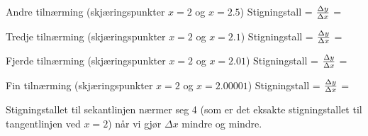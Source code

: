 \vskip 10pt

Andre tilnærming (skjæringspunkter $x = 2$ og $x = 2.5$) \hskip 50pt  Stigningstall = ${\Delta y \over \Delta x}$ = 

\vskip 10pt

Tredje tilnærming (skjæringspunkter $x = 2$ og $x = 2.1$) \hskip 50pt  Stigningstall = ${\Delta y \over \Delta x}$ = 

\vskip 10pt

Fjerde tilnærming (skjæringspunkter $x = 2$ og $x = 2.01$) \hskip 50pt  Stigningstall = ${\Delta y \over \Delta x}$ = 

\vskip 10pt

Fin tilnærming (skjæringspunkter $x = 2$ og $x = 2.00001$) \hskip 50pt  Stigningstall = ${\Delta y \over \Delta x}$ = 

\vskip 10pt

Stigningstallet til sekantlinjen nærmer seg 4 (som er det eksakte stigningstallet til tangentlinjen ved $x=2$) når vi gjør $\Delta x$ mindre og mindre.










